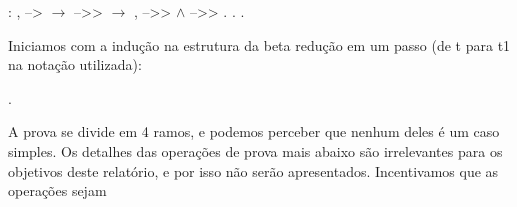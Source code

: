 \begin{coqdoccode}
\coqdocemptyline
\coqdocnoindent
{} : \coqdockw{\ensuremath{\forall}}    ,  -->  \ensuremath{\rightarrow}  -->>  \ensuremath{\rightarrow} \coqdoctac{\ensuremath{\exists}} ,  -->>  \ensuremath{\land}  -->> .\coqdoceol
\coqdocnoindent
{}.\coqdoceol
\coqdocindent{1.00em}
     .\coqdoceol
\coqdocemptyline
\end{coqdoccode}
Iniciamos com a indução na estrutura da beta redução em um passo (de t para t1 na notação utilizada):\begin{coqdoccode}
\coqdocemptyline
\coqdocindent{1.00em}
 .\coqdoceol
\coqdocemptyline
\end{coqdoccode}
A prova se divide em 4 ramos, e podemos perceber que nenhum deles é um caso simples. Os detalhes das operações de prova mais
abaixo são irrelevantes para os objetivos deste relatório, e por isso não serão apresentados. Incentivamos que as operações sejam
